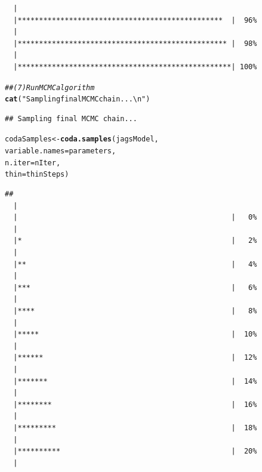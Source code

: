 \documentclass{article}\usepackage[]{graphicx}\usepackage[]{color}
\makeatletter
\newcommand{\hlstr}[1]{\textcolor[rgb]{0.192,0.494,0.8}{#1}}%
\newcommand{\hlcom}[1]{\textcolor[rgb]{0.678,0.584,0.686}{\textit{#1}}}%
\newcommand{\hlstd}[1]{\textcolor[rgb]{0.345,0.345,0.345}{#1}}%
\newcommand{\hlkwb}[1]{\textcolor[rgb]{0.69,0.353,0.396}{#1}}%
\newcommand{\hlkwc}[1]{\textcolor[rgb]{0.333,0.667,0.333}{#1}}%
\newcommand{\hlkwd}[1]{\textcolor[rgb]{0.737,0.353,0.396}{\textbf{#1}}}%
\newenvironment{kframe}{%
 \def\at@end@of@kframe{}%
 \ifinner\ifhmode%
  \def\at@end@of@kframe{\end{minipage}}%
  \begin{minipage}{\columnwidth}%
 \fi\fi%
 \def\FrameCommand##1{\hskip\@totalleftmargin \hskip-\fboxsep
 \colorbox{shadecolor}{##1}\hskip-\fboxsep
     \hskip-\linewidth \hskip-\@totalleftmargin \hskip\columnwidth}%
 \MakeFramed {\advance\hsize-\width
   \@totalleftmargin\z@ \linewidth\hsize
   \@setminipage}}%
 {\par\unskip\endMakeFramed%
 \at@end@of@kframe}
\newenvironment{knitrout}{}{} %
\makeatother
\begin{document}
\begin{knitrout}
\begin{kframe}
\begin{verbatim}
  |                                                        
  |************************************************  |  96%
  |                                                        
  |************************************************* |  98%
  |                                                        
  |**************************************************| 100%
\end{verbatim}
\begin{alltt}
\hlcom{## (7) Run MCMC algorithm}
\hlkwd{cat}\hlstd{(}\hlstr{"Sampling final MCMC chain...\textbackslash{}n"} \hlstd{)}
\end{alltt}
\begin{verbatim}
## Sampling final MCMC chain...
\end{verbatim}
\begin{alltt}
\hlstd{codaSamples} \hlkwb{<-} \hlkwd{coda.samples}\hlstd{(jagsModel,}
                             \hlkwc{variable.names} \hlstd{= parameters,}
                             \hlkwc{n.iter} \hlstd{= nIter,}
                             \hlkwc{thin} \hlstd{= thinSteps)}
\end{alltt}
\begin{verbatim}
## 
  |                                                        
  |                                                  |   0%
  |                                                        
  |*                                                 |   2%
  |                                                        
  |**                                                |   4%
  |                                                        
  |***                                               |   6%
  |                                                        
  |****                                              |   8%
  |                                                        
  |*****                                             |  10%
  |                                                        
  |******                                            |  12%
  |                                                        
  |*******                                           |  14%
  |                                                        
  |********                                          |  16%
  |                                                        
  |*********                                         |  18%
  |                                                        
  |**********                                        |  20%
  |                                                        

\end{verbatim}
\end{kframe}
\end{knitrout}
\end{document}
